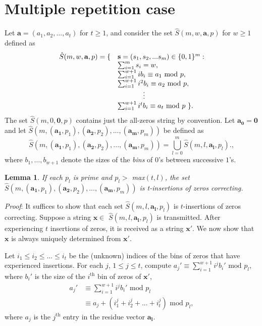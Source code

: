 \documentclass[10pt,conference]{IEEEtran}
\newtheorem{lemma}{Lemma}
\begin{document}
\section{Multiple repetition case}\label{many}

Let $\mathbf{a}=\left(a_1,a_2,...,a_t\right)$ for $t \geq 1$, and
consider the set $\hat{S}(m,w,\mathbf{a},p)$ for $w \geq 1$
defined as
\begin{equation}\begin{array}{lll}\hat{S}(m,w,\mathbf{a},p) = \{ & \mathbf{s}=(s_1, s_2, ... s_m) \in \{0,1\}^m
:\\ {} & \sum_{i=1}^m s_i = w,\\
{} & \sum_{i=1}^{w+1} ib_i \equiv a_1 \text{ mod } p,\\ {} &
\sum_{i=1}^{w+1} i^2b_i
\equiv a_2 \text{ mod } p,\\
{} & \hspace{0.5in}\vdots\\ {} & \sum_{i=1}^{w+1} i^tb_i \equiv a_t
\text{ mod } p~\}.\end{array}\end{equation} The set
$\hat{S}(m,0,\mathbf{0},p)$ contains just the all-zeros string by
convention. Let $\mathbf{a_0} = \mathbf{0}$ and let
$\hat{S}\left(m,(\mathbf{a_1},p_1),(\mathbf{a_2},p_2),...,(\mathbf{a_m},p_m)\right)$
be defined as
\begin{equation}\label{union}\hat{S}\left(m,(\mathbf{a_1},p_1),(\mathbf{a_2},p_2),...,(\mathbf{a_m},p_m)\right)=
\bigcup_{l=0}^{m} \hat{S}(m,l,\mathbf{a_l},p_l).,\end{equation}
where $b_1, \ldots, b_{w+1}$ denote the sizes of the
{\em bins} of $0$'s between successive $1$'s.

\begin{lemma}\textit{If each $p_l$ is prime and $p_l >$
max$(t,l)$, the set
$\hat{S}\left(m,(\mathbf{a_1},p_1),(\mathbf{a_2},p_2),...,(\mathbf{a_m},p_m)\right)$
is t-insertions of zeros correcting.}\end{lemma}

\textit{Proof}: It suffices to show that each set
$\hat{S}(m,l,\mathbf{a_l},p_l)$ is $t$-insertions of zeros
correcting. Suppose a string $\mathbf{x} \in$
$\hat{S}(m,l,\mathbf{a_l},p_l)$ is transmitted. After experiencing
$t$ insertions of zeros, it is received as a string $\mathbf{x'}$.
We now show that $\mathbf{x}$ is always uniquely determined from
$\mathbf{x'}$.

Let $i_1 \leq i_2 \leq ... \leq i_t$ be the (unknown) indices of the
bins of zeros that have experienced insertions. For each $j$, $1\leq
j \leq t$, compute $a_j'\equiv \sum_{i=1}^{w+1} i^jb_i' \text{ mod }
p_l$, where $b_i'$ is the size of the $i^{\text{th}}$ bin of zeros
of $\mathbf{x'}$,
\begin{equation}\label{eq5}\begin{array}{ll}
a_j'& \equiv \sum_{i=1}^{w+1} i^jb_i' \text{ mod } p_l\\
{}  & \equiv a_j + (i_1^j+i_2^j+...+i_t^j) \text{ mod }p_l,
\end{array}
\end{equation}
where $a_j$ is the $j^{\text{th}}$ entry in the residue vector
$\mathbf{a_l}$.
\end{document}
